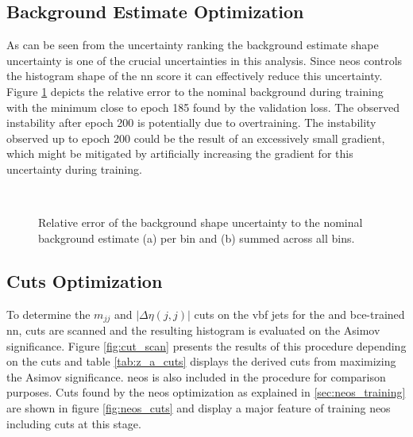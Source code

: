 

\subsection{Background Estimate Optimization}
As can be seen from the uncertainty ranking the background estimate shape uncertainty is one of the crucial uncertainties in this analysis. Since \ac{neos} controls the histogram shape of the \ac{nn} score it can effectively reduce this uncertainty. Figure \ref{fig:neos_valid_bkg_shape_sys} depicts the relative error to the nominal background during training with the minimum close to epoch 185 found by the validation loss. The observed instability after epoch 200 is potentially due to overtraining. The instability observed up to epoch 200 could be the result of an excessively small gradient, which might be mitigated by artificially increasing the gradient for this uncertainty during training.
\begin{figure}
    \centering
    \\
    \caption[]{Relative error of the background shape uncertainty to the nominal background estimate (a) per bin and (b) summed across all bins.}
    \label{fig:neos_valid_bkg_shape_sys}
\end{figure}

\subsection{Cuts Optimization}
To determine the $m_{jj}$ and $|\Delta\eta(j,j)|$ cuts on the \ac{vbf} jets for the \mhh and \ac{bce}-trained \ac{nn}, cuts are scanned and the resulting histogram is evaluated on the Asimov significance. Figure \ref{fig:cut_scan} presents the results of this procedure depending on the cuts and table \ref{tab:z_a_cuts} displays the derived cuts from maximizing the Asimov significance. \ac{neos} is also included in the procedure for comparison purposes. Cuts found by the \ac{neos} optimization as explained in \ref{sec:neos_training} are shown in figure \ref{fig:neos_cuts} and display a major feature of training \ac{neos} including cuts at this stage.

